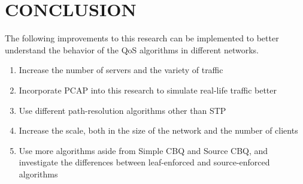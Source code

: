 \chapter{CONCLUSION}



The following improvements to this research can be implemented to better understand the behavior of the QoS algorithms in different networks.
\begin{enumerate}
    \item Increase the number of servers and the variety of traffic
    \item Incorporate PCAP into this research to simulate real-life traffic better
    \item Use different path-resolution algorithms other than STP
    \item Increase the scale, both in the size of the network and the number of clients
    \item Use more algorithms aside from Simple CBQ and Source CBQ, and investigate the differences between leaf-enforced and source-enforced algorithms
\end{enumerate}
